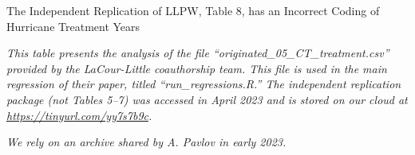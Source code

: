 \documentclass{article}
\begin{document}
\begin{table}
\caption{The Independent Replication of LLPW, Table 8, has an Incorrect Coding of Hurricane Treatment Years}

\emph{This table presents the analysis of the file “originated\_05\_CT\_treatment.csv” provided by the LaCour-Little coauthorship team. This file is used in the main regression of their paper, titled “run\_regressions.R.” The independent replication package (not Tables 5--7) was accessed in April 2023 and is stored on our cloud at \url{https://tinyurl.com/yy7s7b9c}.}

\begin{center}

\end{center}

\emph{We rely on an archive shared by A. Pavlov in early 2023.}

\end{table}
\end{document}
